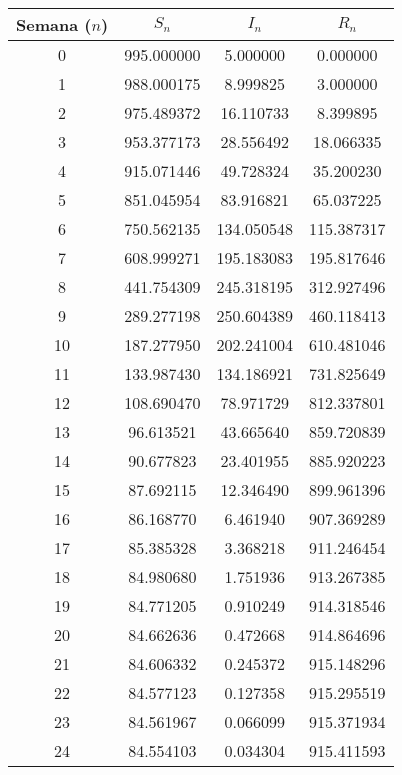 \documentclass{article}
\begin{document}
\begin{table}[htpb]
\centering
\begin{tabular}{|c|c|c|c|}
\hline
\textbf{Semana ($n$)} & \textbf{$S_n$} & \textbf{$I_n$} & \textbf{$R_n$} \\ \hline
0  & 995.000000   & 5.000000    & 0.000000 \\ \hline
1  & 988.000175   & 8.999825    & 3.000000 \\ \hline
2  & 975.489372   & 16.110733   & 8.399895 \\ \hline
3  & 953.377173   & 28.556492   & 18.066335 \\ \hline
4  & 915.071446   & 49.728324   & 35.200230 \\ \hline
5  & 851.045954   & 83.916821   & 65.037225 \\ \hline
6  & 750.562135   & 134.050548  & 115.387317 \\ \hline
7  & 608.999271   & 195.183083  & 195.817646 \\ \hline
8  & 441.754309   & 245.318195  & 312.927496 \\ \hline
9  & 289.277198   & 250.604389  & 460.118413 \\ \hline
10 & 187.277950   & 202.241004  & 610.481046 \\ \hline
11 & 133.987430   & 134.186921  & 731.825649 \\ \hline
12 & 108.690470   & 78.971729   & 812.337801 \\ \hline
13 & 96.613521    & 43.665640   & 859.720839 \\ \hline
14 & 90.677823    & 23.401955   & 885.920223 \\ \hline
15 & 87.692115    & 12.346490   & 899.961396 \\ \hline
16 & 86.168770    & 6.461940    & 907.369289 \\ \hline
17 & 85.385328    & 3.368218    & 911.246454 \\ \hline
18 & 84.980680    & 1.751936    & 913.267385 \\ \hline
19 & 84.771205    & 0.910249    & 914.318546 \\ \hline
20 & 84.662636    & 0.472668    & 914.864696 \\ \hline
21 & 84.606332    & 0.245372    & 915.148296 \\ \hline
22 & 84.577123    & 0.127358    & 915.295519 \\ \hline
23 & 84.561967    & 0.066099    & 915.371934 \\ \hline
24 & 84.554103    & 0.034304    & 915.411593 \\ \hline

\end{tabular}
\end{table}
\end{document}
